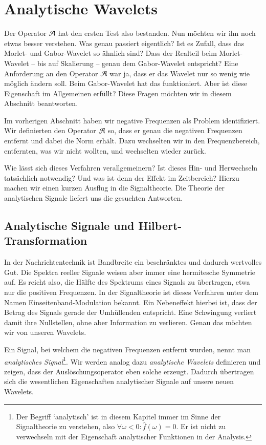 \section{Analytische Wavelets}
Der Operator $\Ana\,$ hat den ersten Test also bestanden.
Nun möchten wir ihn noch etwas besser verstehen.
Was genau passiert eigentlich?
Ist es Zufall, dass das Morlet- und Gabor-Wavelet so ähnlich sind?
Dass der Realteil beim Morlet-Wavelet -- bis auf Skalierung -- genau dem Gabor-Wavelet entspricht?
Eine Anforderung an den Operator $\Ana\,$ war ja, dass er das Wavelet nur so wenig wie möglich ändern soll.
Beim Gabor-Wavelet hat das funktioniert.
Aber ist diese Eigenschaft im Allgemeinen erfüllt?
Diese Fragen möchten wir in diesem Abschnitt beantworten.

Im vorherigen Abschnitt haben wir negative Frequenzen als Problem identifiziert.
Wir definierten den Operator $\Ana\,$ so, dass er genau die negativen Frequenzen entfernt und dabei die Norm erhält.
Dazu wechselten wir in den Frequenzbereich, entfernten, was wir nicht wollten, und wechselten wieder zurück.

Wie lässt sich dieses Verfahren verallgemeinern? 
Ist dieses Hin- und Herwechseln tatsächlich notwendig?
Und was ist denn der Effekt im Zeitbereich?
Hierzu machen wir einen kurzen Ausflug in die Signaltheorie.
Die Theorie der analytischen Signale liefert uns die gesuchten Antworten.


\subsection{Analytische Signale und Hilbert-Transformation}
In der Nachrichtentechnik ist Bandbreite ein beschränktes und dadurch wertvolles Gut.
Die Spektra reeller Signale weisen aber immer eine hermitesche Symmetrie auf.
Es reicht also, die Hälfte des Spektrums eines Signals zu übertragen, etwa nur die positiven Frequenzen.
In der Signaltheorie ist dieses Verfahren unter dem Namen Einseitenband-Modulation bekannt.
Ein Nebeneffekt hierbei ist, dass der Betrag des Signals gerade der Umhüllenden entspricht.
Eine Schwingung verliert damit ihre Nullstellen, ohne aber Information zu verlieren.
Genau das möchten wir von unseren Wavelets.

Ein Signal, bei welchem die negativen Frequenzen entfernt wurden, nennt man \emph{analytisches Signal}\footnote{
	Der Begriff `analytisch' ist in diesem Kapitel immer im Sinne der Signaltheorie zu verstehen, also $\forall \omega < 0 \colon \hat f (\omega) = 0 $.
	Er ist nicht zu verwechseln mit der Eigenschaft analytischer Funktionen in der Analysis.
}.
Wir werden analog dazu \emph{analytische Wavelets} definieren und zeigen, dass der Auslöschungsoperator eben solche erzeugt.
Dadurch übertragen sich die wesentlichen Eigenschaften analytischer Signale auf unsere neuen Wavelets.


